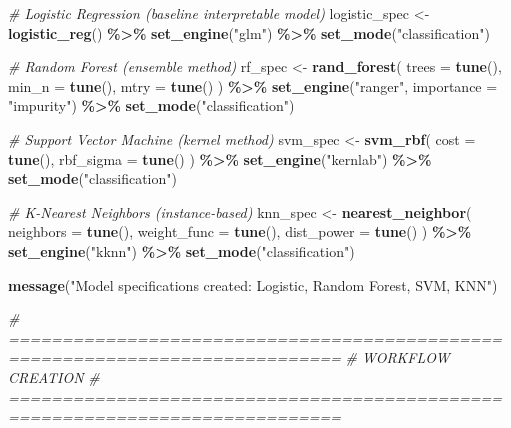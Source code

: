 \documentclass[
]{article}
\newenvironment{Shaded}{\begin{snugshade}}{\end{snugshade}}
\newcommand{\AttributeTok}[1]{\textcolor[rgb]{0.13,0.29,0.53}{#1}}
\newcommand{\CommentTok}[1]{\textcolor[rgb]{0.56,0.35,0.01}{\textit{#1}}}
\newcommand{\FunctionTok}[1]{\textcolor[rgb]{0.13,0.29,0.53}{\textbf{#1}}}
\newcommand{\NormalTok}[1]{#1}
\newcommand{\OtherTok}[1]{\textcolor[rgb]{0.56,0.35,0.01}{#1}}
\newcommand{\SpecialCharTok}[1]{\textcolor[rgb]{0.81,0.36,0.00}{\textbf{#1}}}
\newcommand{\StringTok}[1]{\textcolor[rgb]{0.31,0.60,0.02}{#1}}
\begin{document}
\begin{Shaded}
\begin{Highlighting}[]
\CommentTok{\# Logistic Regression (baseline interpretable model)}
\NormalTok{logistic\_spec }\OtherTok{\textless{}{-}} \FunctionTok{logistic\_reg}\NormalTok{() }\SpecialCharTok{\%\textgreater{}\%}
  \FunctionTok{set\_engine}\NormalTok{(}\StringTok{"glm"}\NormalTok{) }\SpecialCharTok{\%\textgreater{}\%}
  \FunctionTok{set\_mode}\NormalTok{(}\StringTok{"classification"}\NormalTok{)}

\CommentTok{\# Random Forest (ensemble method)}
\NormalTok{rf\_spec }\OtherTok{\textless{}{-}} \FunctionTok{rand\_forest}\NormalTok{(}
  \AttributeTok{trees =} \FunctionTok{tune}\NormalTok{(),}
  \AttributeTok{min\_n =} \FunctionTok{tune}\NormalTok{(),}
  \AttributeTok{mtry =} \FunctionTok{tune}\NormalTok{()}
\NormalTok{) }\SpecialCharTok{\%\textgreater{}\%}
  \FunctionTok{set\_engine}\NormalTok{(}\StringTok{"ranger"}\NormalTok{, }\AttributeTok{importance =} \StringTok{"impurity"}\NormalTok{) }\SpecialCharTok{\%\textgreater{}\%}
  \FunctionTok{set\_mode}\NormalTok{(}\StringTok{"classification"}\NormalTok{)}

\CommentTok{\# Support Vector Machine (kernel method)}
\NormalTok{svm\_spec }\OtherTok{\textless{}{-}} \FunctionTok{svm\_rbf}\NormalTok{(}
  \AttributeTok{cost =} \FunctionTok{tune}\NormalTok{(),}
  \AttributeTok{rbf\_sigma =} \FunctionTok{tune}\NormalTok{()}
\NormalTok{) }\SpecialCharTok{\%\textgreater{}\%}
  \FunctionTok{set\_engine}\NormalTok{(}\StringTok{"kernlab"}\NormalTok{) }\SpecialCharTok{\%\textgreater{}\%}
  \FunctionTok{set\_mode}\NormalTok{(}\StringTok{"classification"}\NormalTok{)}

\CommentTok{\# K{-}Nearest Neighbors (instance{-}based)}
\NormalTok{knn\_spec }\OtherTok{\textless{}{-}} \FunctionTok{nearest\_neighbor}\NormalTok{(}
  \AttributeTok{neighbors =} \FunctionTok{tune}\NormalTok{(),}
  \AttributeTok{weight\_func =} \FunctionTok{tune}\NormalTok{(),}
  \AttributeTok{dist\_power =} \FunctionTok{tune}\NormalTok{()}
\NormalTok{) }\SpecialCharTok{\%\textgreater{}\%}
  \FunctionTok{set\_engine}\NormalTok{(}\StringTok{"kknn"}\NormalTok{) }\SpecialCharTok{\%\textgreater{}\%}
  \FunctionTok{set\_mode}\NormalTok{(}\StringTok{"classification"}\NormalTok{)}

\FunctionTok{message}\NormalTok{(}\StringTok{"Model specifications created: Logistic, Random Forest, SVM, KNN"}\NormalTok{)}

\CommentTok{\# =============================================================================}
\CommentTok{\# WORKFLOW CREATION}
\CommentTok{\# =============================================================================}


\end{Highlighting}
\end{Shaded}
\end{document}
